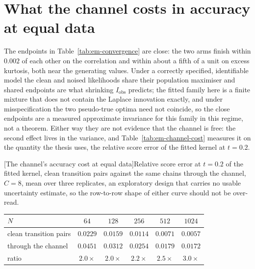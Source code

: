

\section{What the channel costs in accuracy at equal data}
\label{sec:em-information}

The endpoints in Table~\ref{tab:em-convergence} are close: the two arms finish
within $0.002$ of each other on the correlation and within about a fifth of a
unit on excess kurtosis, both near the generating values. Under a correctly
specified, identifiable model the clean and noised likelihoods share their
population maximiser and shared endpoints are what shrinking
$I_{\mathrm{obs}}$ predicts; the fitted family here is a finite mixture that
does not contain the Laplace innovation exactly, and under misspecification
the two pseudo-true optima need not coincide, so the close endpoints are a
measured approximate invariance for this family in this regime, not a
theorem. Either way they are not evidence that the channel is free: the
second effect lives in the variance, and Table~\ref{tab:em-channel-cost}
measures it on the quantity the thesis uses, the relative score error of the
fitted kernel at $t = 0.2$.

\begin{center}
\begin{minipage}{\linewidth}\centering
{}[The channel's accuracy cost at equal data]{Relative score
error at $t = 0.2$ of the fitted kernel, clean transition pairs against the
same chains through the channel, $C = 8$, mean over three replicates, an
exploratory design that carries no usable uncertainty estimate, so the
row-to-row shape of either curve should not be over-read.}
\label{tab:em-channel-cost}
\small
\begin{tabular}{@{}lccccc@{}}
\toprule
$N$ & $64$ & $128$ & $256$ & $512$ & $1024$ \\
\midrule
clean transition pairs & $0.0229$ & $0.0159$ & $0.0114$ & $0.0071$ & $0.0057$ \\
through the channel    & $0.0451$ & $0.0312$ & $0.0254$ & $0.0179$ & $0.0172$ \\
\midrule
ratio                  & $2.0\times$ & $2.0\times$ & $2.2\times$ & $2.5\times$ & $3.0\times$ \\
\bottomrule
\end{tabular}
\end{minipage}
\end{center}

